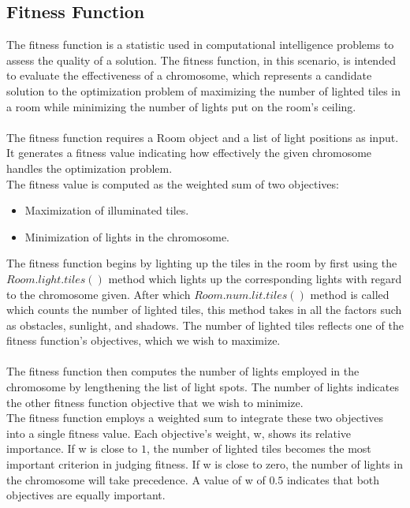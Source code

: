 \documentclass[conference]{IEEEtran}
\begin{document}
\subsection{Fitness Function}
The fitness function is a statistic used in computational intelligence problems to assess the quality of a solution. The fitness function, in this scenario, is intended to evaluate the effectiveness of a chromosome, which represents a candidate solution to the optimization problem of maximizing the number of lighted tiles in a room while minimizing the number of lights put on the room's ceiling.\\
\\
The fitness function requires a Room object and a list of light positions as input. It generates a fitness value indicating how effectively the given chromosome handles the optimization problem.\\

The fitness value is computed as the weighted sum of two objectives:
\begin{itemize}
    \item Maximization of illuminated tiles.
    \item Minimization of lights in the chromosome.\\
\end{itemize}

The fitness function begins by lighting up the tiles in the room by first using the $Room.light.tiles()$ method which lights up the corresponding lights with regard to the chromosome given. After which $Room.num.lit.tiles()$ method is called which counts the number of lighted tiles, this method takes in all the factors such as obstacles, sunlight, and shadows. The number of lighted tiles reflects one of the fitness function's objectives, which we wish to maximize.\\
\\
The fitness function then computes the number of lights employed in the chromosome by lengthening the list of light spots. The number of lights indicates the other fitness function objective that we wish to minimize.\\

The fitness function employs a   weighted sum to integrate these two objectives into a single fitness value. Each objective's weight, w, shows its relative importance. If w is close to $1$, the number of lighted tiles becomes the most important criterion in judging fitness. If w is close to zero, the number of lights in the chromosome will take precedence. A value of w of $0.5$ indicates that both objectives are equally important.
\end{document}
